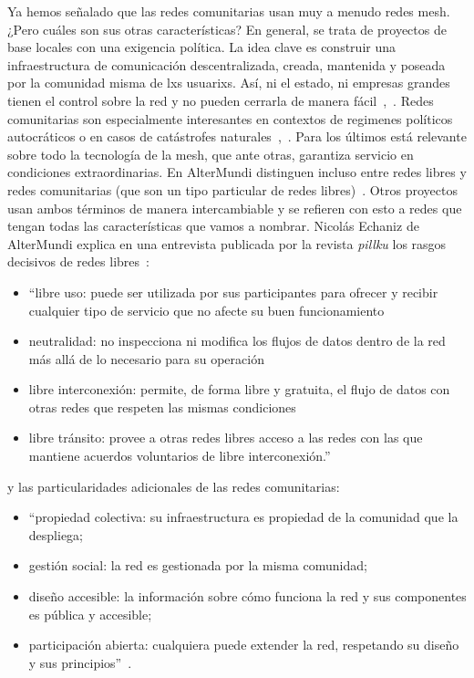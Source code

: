 Ya hemos señalado que las redes comunitarias usan muy a menudo redes mesh.
¿Pero cuáles son sus otras características?
En general, se trata de proyectos de base locales con una exigencia política.
La idea clave es construir una infraestructura de comunicación descentralizada, creada, mantenida y poseada por la comunidad misma de lxs usuarixs.
Así, ni el estado, ni empresas grandes tienen el control sobre la red y no pueden cerrarla de manera fácil~\autocite{Medosch2004},~\autocite{FiTre2015}.
Redes comunitarias son especialmente interesantes en contextos de regimenes políticos autocráticos o en casos de catástrofes naturales~\autocite[12]{Mabb2014},~\autocite{FiTre2015}.
Para los últimos está relevante sobre todo la tecnología de la mesh, que ante otras, garantiza servicio en condiciones extraordinarias.
En AlterMundi distinguen incluso entre redes libres y redes comunitarias (que son un tipo particular de redes libres)~\autocite{Piccoli2015}.
Otros proyectos usan ambos términos de manera intercambiable y se refieren con esto a redes que tengan todas las características que vamos a nombrar.
Nicolás Echaniz de AlterMundi explica en una entrevista publicada por la revista \textit{pillku} los rasgos decisivos de redes libres~\autocite{Piccoli2015}:
\begin{itemize}
  \item ``libre uso: puede ser utilizada por sus participantes para ofrecer y recibir cualquier tipo de servicio que no afecte su buen funcionamiento
  \item neutralidad: no inspecciona ni modifica los flujos de datos dentro de la red más allá de lo necesario para su operación
  \item libre interconexión: permite, de forma libre y gratuita, el flujo de datos con otras redes que respeten las mismas condiciones
  \item libre tránsito: provee a otras redes libres acceso a las redes con las que mantiene acuerdos voluntarios de libre interconexión.''
\end{itemize}

y las particularidades adicionales de las redes comunitarias:
\begin{itemize}
   \item ``propiedad colectiva: su infraestructura es propiedad de la comunidad que la despliega;
   \item gestión social: la red es gestionada por la misma comunidad;
   \item diseño accesible: la información sobre cómo funciona la red y sus componentes es pública y accesible;
   \item participación abierta: cualquiera puede extender la red, respetando su diseño y sus principios''~\autocite{Piccoli2015}.
\end{itemize}

